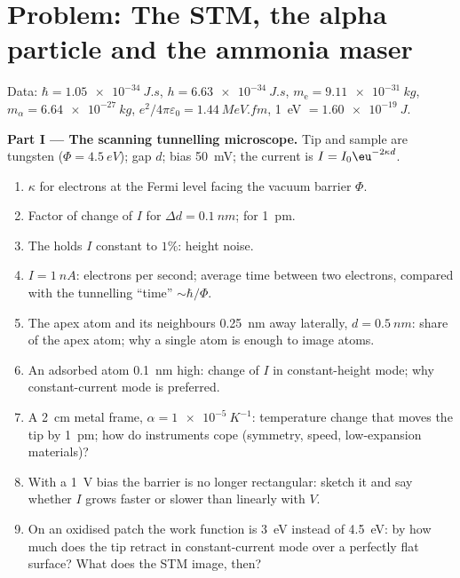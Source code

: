 \section{Problem: The STM, the alpha particle and the ammonia maser}

\begin{problem}\label{pb:b2:potential-wells-tunneling:1}
Data: $\hbar = \qty{1.05e-34}{J.s}$, $h = \qty{6.63e-34}{J.s}$, $m_{\text{e}} =
\qty{9.11e-31}{kg}$, $m_\alpha = \qty{6.64e-27}{kg}$, $e^2/4\pi\varepsilon_0 =
\qty{1.44}{MeV.fm}$, \qty{1}{eV} $= \qty{1.60e-19}{J}$.

\textbf{Part I --- The scanning tunnelling microscope.}
Tip and sample are tungsten ($\Phi = \qty{4.5}{eV}$); gap $d$; bias
\qty{50}{mV}; the current is $I = I_0\eu^{-2\kappa d}$.
\begin{enumerate}
  \item $\kappa$ for electrons at the Fermi level facing the vacuum
        barrier $\Phi$.
  \item Factor of change of $I$ for $\Delta d = \qty{0.1}{nm}$; for
        \qty{1}{pm}.
  \item The  holds $I$ constant to $1\%$: height noise.
  \item $I = \qty{1}{nA}$: electrons per second; average time between two
        electrons, compared with the tunnelling ``time'' $\sim\hbar/\Phi$.
  \item The apex atom and its neighbours \qty{0.25}{nm} away laterally,
        $d = \qty{0.5}{nm}$: share of the apex atom; why a single atom is
        enough to image atoms.
  \item An adsorbed atom \qty{0.1}{nm} high: change of $I$ in
        constant-height mode; why constant-current mode is preferred.
  \item A \qty{2}{cm} metal frame, $\alpha = \qty{1e-5}{K^{-1}}$: temperature
        change that moves the tip by \qty{1}{pm}; how do instruments
        cope (symmetry, speed, low-expansion materials)?
  \item With a \qty{1}{V} bias the barrier is no longer rectangular:
        sketch it and say whether $I$ grows faster or slower than
        linearly with $V$.
  \item On an oxidised patch the work function is \qty{3}{eV} instead
        of \qty{4.5}{eV}: by how much does the tip retract in
        constant-current mode over a perfectly flat surface? What does
        the STM image, then?
\end{enumerate}


\end{problem}
